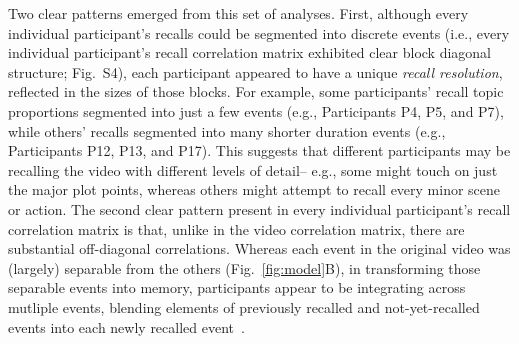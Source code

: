 \documentclass{article}
\newcommand{\corrmats}{S4}
\begin{document}
Two clear patterns emerged from this set of analyses.  First, although every individual participant's recalls could be segmented into discrete events (i.e., every individual participant's recall correlation matrix exhibited clear block diagonal structure; Fig.~\corrmats), each participant appeared to have a unique \textit{recall resolution}, reflected in the sizes of those blocks.  For example, some participants' recall topic proportions segmented into just a few events (e.g., Participants P4, P5, and P7), while others' recalls segmented into many shorter duration events (e.g., Participants P12, P13, and P17).  This suggests that different participants may be recalling the video with different levels of detail-- e.g., some might touch on just the major plot points, whereas others might attempt to recall every minor scene or action.  The second clear pattern present in every individual participant's recall correlation matrix is that, unlike in the video correlation matrix, there are substantial off-diagonal correlations.  Whereas each event in the original video was (largely) separable from the others (Fig.~\ref{fig:model}B), in transforming those separable events into memory, participants appear to be integrating across mutliple events, blending elements of previously recalled and not-yet-recalled events into each newly recalled event~\citep[Figs.~\ref{fig:model}D, \corrmats; also see][]{MannEtal11, HowaEtal12}.
\end{document}

